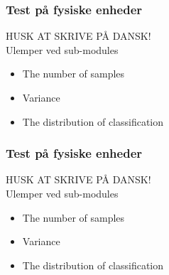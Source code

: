 \begin{frame}
    \frametitle{Test på fysiske enheder}
    HUSK AT SKRIVE PÅ DANSK!\\
    Ulemper ved sub-modules
    \begin{itemize}
        \item The number of samples
        \item Variance
        \item The distribution of classification
    \end{itemize}
\end{frame}

\begin{frame}
    \frametitle{Test på fysiske enheder}
    HUSK AT SKRIVE PÅ DANSK!\\
    Ulemper ved sub-modules
    \begin{itemize}
        \item The number of samples
        \item Variance
        \item The distribution of classification
    \end{itemize}
\end{frame}
